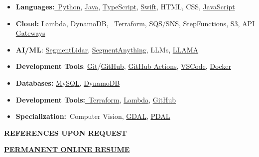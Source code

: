 \begin{itemize}
\item
  \textbf{Languages:}\href{https://www.python.org/}{~Python},
  \href{https://www.java.com/en/}{Java},
  \href{https://www.typescriptlang.org/}{TypeScript},
  \href{https://www.swift.org/}{Swift}, HTML, CSS,
  \href{https://www.javascript.com/}{JavaScript}
\item
  \textbf{Cloud:}
  \href{https://aws.amazon.com/pm/lambda/?gclid=CjwKCAiAiOa9BhBqEiwABCdG8_-jcsK9i3KVP2t5NgupDXinpyF36M-7OgfzGPhJI0F8zaahD0sMmBoC8NIQAvD_BwE\&trk=e0e0d4be-47fe-4336-ab69-7eece7f3d36e\&sc_channel=ps\&ef_id=CjwKCAiAiOa9BhBqEiwABCdG8_-jcsK9i3KVP2t5NgupDXinpyF36M-7OgfzGPhJI0F8zaahD0sMmBoC8NIQAvD_BwE:G:s\&s_kwcid=AL!4422!3!652240143523!e!!g!!amazon\%20lambda!19878797032!147151597893}{Lambda},
  \href{https://aws.amazon.com/dynamodb/}{DynamoDB},
  \href{https://developer.hashicorp.com/terraform/language}{~Terraform},
  \href{https://aws.amazon.com/sqs/}{SQS}/\href{https://aws.amazon.com/sns/}{SNS},
  \href{https://aws.amazon.com/step-functions/}{StepFunctions},
  \href{https://aws.amazon.com/s3/}{S3},
  \href{https://aws.amazon.com/api-gateway/}{API Gateways}
\item
  \textbf{AI/ML}:
  \href{https://github.com/Yarroudh/segment-lidar}{SegmentLidar},
  \href{https://segment-anything.com/}{SegmentAnything}, LLMs,
  \href{https://www.llama.com/}{LLAMA}
\item
  \textbf{Development Tools}:
  \href{https://git-scm.com/}{Git}/\href{https://github.com/}{GitHub},
  \href{https://github.com/TomTheTonk/Resume/actions}{GitHub Actions},
  \href{https://code.visualstudio.com/}{VSCode},
  \href{https://www.docker.com}{Docker}
\item
  \textbf{Databases:} \href{https://www.mysql.com/}{MySQL},
  \href{https://aws.amazon.com/dynamodb/}{DynamoDB}
\item
  \textbf{Development
  Tools:}\href{https://developer.hashicorp.com/terraform/language}{~Terraform},
  \href{https://aws.amazon.com/pm/lambda/?gclid=CjwKCAiAiOa9BhBqEiwABCdG8_-jcsK9i3KVP2t5NgupDXinpyF36M-7OgfzGPhJI0F8zaahD0sMmBoC8NIQAvD_BwE\&trk=e0e0d4be-47fe-4336-ab69-7eece7f3d36e\&sc_channel=ps\&ef_id=CjwKCAiAiOa9BhBqEiwABCdG8_-jcsK9i3KVP2t5NgupDXinpyF36M-7OgfzGPhJI0F8zaahD0sMmBoC8NIQAvD_BwE:G:s\&s_kwcid=AL!4422!3!652240143523!e!!g!!amazon\%20lambda!19878797032!147151597893}{Lambda},
  \href{https://github.com/}{GitHub}
\item
  \textbf{Specialization:}~Computer Vision,
  \href{https://gdal.org/en/stable/}{GDAL},
  \href{https://pdal.io/en/2.8.4/}{PDAL}
\end{itemize}

\textbf{REFERENCES UPON REQUEST}

\href{http://github.com/TomTheTonk/Resume}{\textbf{PERMANENT ONLINE
RESUME}}
